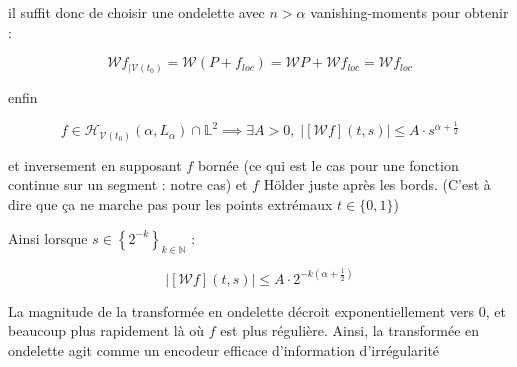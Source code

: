 il suffit donc de choisir une ondelette avec $n > \alpha$ vanishing-moments pour obtenir :

\begin{equation*}
	\mathcal W f_{| \mathcal V(t_0)} {=} \mathcal W ( P + f_{loc} ) = \mathcal W P + \mathcal W f_{loc} = \mathcal W f_{loc}
\end{equation*}

enfin
\begin{thm}


	\begin{equation*}
		f \in \mathcal H_{\mathcal V({t_0})}(\alpha, L_\alpha) \cap \mathds L^2 \implies \exists A>0, \; \left|\left[\mathcal Wf\right](t, s)\right| \leq A \cdot s^{\alpha  + \frac 1 2}
	\end{equation*}

	et inversement en supposant $f$ bornée (ce qui est le cas pour une fonction continue sur un segment : notre cas) et $f$ Hölder juste après les bords. (C'est à dire que ça ne marche pas pour les points extrémaux $t \in \{0, 1\}$)
\end{thm}

Ainsi lorsque $s \in \left\{ 2^{-k} \right\}_{k \in \mathds N}$ :

\begin{equation*}
	\left|\left[\mathcal Wf\right](t, s)\right| \leq A \cdot 2^{-k(\alpha  + \frac 1 2)}
\end{equation*}

La magnitude de la transformée en ondelette décroit exponentiellement vers 0, et beaucoup plus rapidement là où $f$ est plus régulière. Ainsi, la transformée en ondelette agit comme un encodeur efficace d'information d'irrégularité

